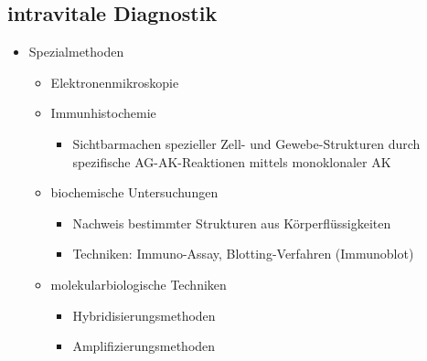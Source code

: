 \subsection{intravitale Diagnostik}
	\begin{itemize}
		\item Spezialmethoden
			\begin{itemize}
				\item Elektronenmikroskopie
				\item Immunhistochemie
					\begin{itemize}
						\item Sichtbarmachen spezieller Zell- und Gewebe-Strukturen durch spezifische AG-AK-Reaktionen mittels monoklonaler AK
					\end{itemize}
				\item biochemische Untersuchungen
					\begin{itemize}
						\item Nachweis bestimmter Strukturen aus Körperflüssigkeiten
						\item Techniken: Immuno-Assay, Blotting-Verfahren (Immunoblot)
					\end{itemize}
				\item molekularbiologische Techniken
					\begin{itemize}
						\item Hybridisierungsmethoden
						\item Amplifizierungsmethoden
					\end{itemize}
		\end{itemize}
	\end{itemize}

